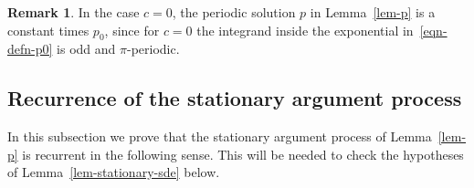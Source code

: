 \documentclass[11pt]{article}
\theoremstyle{plain}
\theoremstyle{definition}
\newtheorem{remark}[thm]{Remark}
\numberwithin{equation}{section}
\begin{document}
\begin{remark} \label{remark-p0} 
In the case $c=0$, the periodic solution $p$ in Lemma~\ref{lem-p} is a constant times $p_0$, since for $c=0$ the integrand inside the exponential in~\eqref{eqn-defn-p0} is odd and $\pi$-periodic.   
\end{remark}

\subsection{Recurrence of the stationary argument process}
\label{sec-recurrence}

In this subsection we prove that the stationary argument process of Lemma~\ref{lem-p} is recurrent in the following sense. 
This will be needed to check the hypotheses of Lemma~\ref{lem-stationary-sde} below. 
\end{document}
